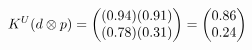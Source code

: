 \documentclass[preview]{standalone}
\begin{document}
\begin{align*}
\special{dvisvgm:raw <g id='unique000'>}K^U(d \otimes p) = \begin{pmatrix} (0.94)(0.91) \\ (0.78)(0.31) \end{pmatrix} = \begin{pmatrix} 0.86 \\ 0.24 \end{pmatrix}\special{dvisvgm:raw </g>}
\end{align*}
\end{document}
